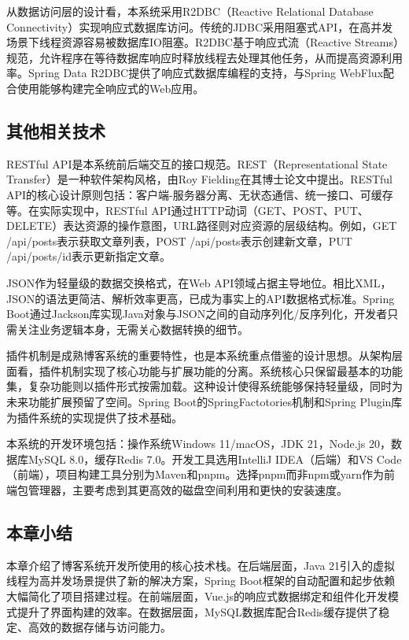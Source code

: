 \documentclass[UTF8,AutoFakeBold=1,AutoFakeSlant,zihao=-4]{SCAU}
\begin{document}
 从数据访问层的设计看，本系统采用R2DBC（Reactive Relational Database Connectivity）实现响应式数据库访问。传统的JDBC采用阻塞式API，在高并发场景下线程资源容易被数据库IO阻塞。R2DBC基于响应式流（Reactive Streams）规范，允许程序在等待数据库响应时释放线程去处理其他任务，从而提高资源利用率{\citep{Vashisht2025}}。Spring Data R2DBC提供了响应式数据库编程的支持，与Spring WebFlux配合使用能够构建完全响应式的Web应用。

 \subsection{其他相关技术}

 RESTful API是本系统前后端交互的接口规范。REST（Representational State Transfer）是一种软件架构风格，由Roy Fielding在其博士论文中提出。RESTful API的核心设计原则包括：客户端-服务器分离、无状态通信、统一接口、可缓存等。在实际实现中，RESTful API通过HTTP动词（GET、POST、PUT、DELETE）表达资源的操作意图，URL路径则对应资源的层级结构。例如，GET /api/posts表示获取文章列表，POST /api/posts表示创建新文章，PUT /api/posts/{id}表示更新指定文章。

 JSON作为轻量级的数据交换格式，在Web API领域占据主导地位。相比XML，JSON的语法更简洁、解析效率更高，已成为事实上的API数据格式标准。Spring Boot通过Jackson库实现Java对象与JSON之间的自动序列化/反序列化，开发者只需关注业务逻辑本身，无需关心数据转换的细节。

 插件机制是成熟博客系统的重要特性，也是本系统重点借鉴的设计思想。从架构层面看，插件机制实现了核心功能与扩展功能的分离。系统核心只保留最基本的功能集，复杂功能则以插件形式按需加载。这种设计使得系统能够保持轻量级，同时为未来功能扩展预留了空间。Spring Boot的SpringFactotories机制和Spring Plugin库为插件系统的实现提供了技术基础。

 本系统的开发环境包括：操作系统Windows 11/macOS，JDK 21，Node.js 20，数据库MySQL 8.0，缓存Redis 7.0。开发工具选用IntelliJ IDEA（后端）和VS Code（前端），项目构建工具分别为Maven和pnpm。选择pnpm而非npm或yarn作为前端包管理器，主要考虑到其更高效的磁盘空间利用和更快的安装速度。

 \subsection{本章小结}

 本章介绍了博客系统开发所使用的核心技术栈。在后端层面，Java 21引入的虚拟线程为高并发场景提供了新的解决方案，Spring Boot框架的自动配置和起步依赖大幅简化了项目搭建过程{\citep{罗涛2020}}。在前端层面，Vue.js的响应式数据绑定和组件化开发模式提升了界面构建的效率{\citep{曾广海2016}}。在数据层面，MySQL数据库配合Redis缓存提供了稳定、高效的数据存储与访问能力。
\end{document}

